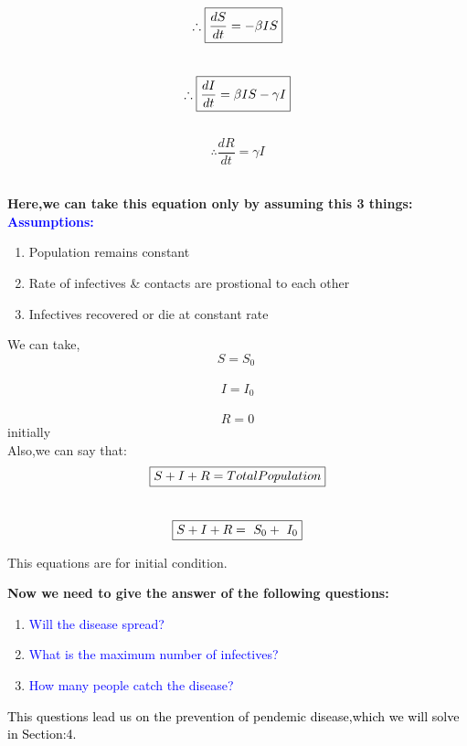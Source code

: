 \documentclass[12pt]{article}
\begin{document}
\begin{equation}
\therefore\boxed{\frac{dS}{dt} =-\beta IS} \\
[1 cm]
\end{equation}
\\
\begin{equation}
\therefore \boxed{\frac{dI}{dt} =\beta IS-\gamma I} \\
\end{equation}
\\
[1 cm]
\begin{equation}
\therefore\boxed{\frac{dR}{dt} =\gamma I}
\end{equation}
\\
[1 cm]
\par  {\bf{Here,we can take this equation only by assuming this 3 things:}}\\

 {\huge \textcolor{blue}\bf{Assumptions:}}\\
\begin{enumerate}
\item Population remains constant
\item Rate of infectives \& contacts are prostional to each other
\item Infectives recovered or die at constant rate\\
\end{enumerate}
\par We can take,
\[S=S_0 \ \]\\
\[I=I_0  \]\\
\[R=0  \]
initially \\
[1 cm]
Also,we can say that:\\
\begin{equation}
\boxed{S+I+R=Total Population}\\
\end{equation}
\\[1 mm]
\begin{equation}
\boxed{S+I+R=\ S_{0}+\ I_{0}}  \\
\end{equation}
\par This equations are for initial condition.
\\[1 cm]
\par {\bf{Now we need to give the answer of the following questions:}}\\
\begin{enumerate}
\item\textcolor{blue}{ Will the disease spread?}\cite{nj8}
\item\textcolor{blue} {What is the maximum number of infectives?}\cite{nj8}
\item\textcolor{blue} {How many people  catch the disease?}\cite{nj8}
\end{enumerate}
\par \textcolor{black}{This questions lead us on the prevention of pendemic disease,which we will solve in Section:4.}\\
\newpage
\end{document}
